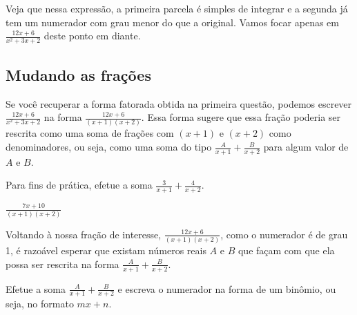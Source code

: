 \documentclass[main_estudante.tex]{subfiles}
\begin{document}
Veja que nessa expressão, a primeira parcela é simples de integrar e a segunda já tem um numerador com grau menor do que a original. Vamos focar apenas em $\frac{12x+6}{x^2+3x+2}$ deste ponto em diante.

\subsection*{Mudando as frações}

Se você recuperar a forma fatorada obtida na primeira questão, podemos escrever $\frac{12x+6}{x^2+3x+2}$ na forma $\frac{12x+6}{(x+1)(x+2)}$. Essa forma sugere que essa fração poderia ser rescrita como uma soma de frações com $(x+1)$ e $(x+2)$ como denominadores, ou seja, como uma soma do tipo $\frac{A}{x+1}+\frac{B}{x+2}$ para algum valor de $A$ e $B$.


\begin{questao}
Para fins de prática, efetue a soma $\frac{3}{x+1}+\frac{4}{x+2}$.
\end{questao}

\begin{gabarito}
	\begin{gabaritoQuestao}
		$\frac{7x+10}{(x+1)(x+2)}$
	\end{gabaritoQuestao}
\end{gabarito}

Voltando à nossa fração de interesse, $\frac{12x+6}{(x+1)(x+2)}$, como o numerador é de grau 1, é razoável esperar que existam números reais $A$ e $B$ que façam com que ela possa ser rescrita na forma $\frac{A}{x+1}+\frac{B}{x+2}$.

\begin{questao}
Efetue a soma $\frac{A}{x+1}+\frac{B}{x+2}$ e escreva o numerador na forma de um binômio, ou seja, no formato $mx+n$.
\end{questao}

\end{document}
